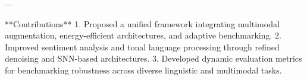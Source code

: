 ---

**Contributions**  
1. Proposed a unified framework integrating multimodal augmentation, energy-efficient architectures, and adaptive benchmarking.  
2. Improved sentiment analysis and tonal language processing through refined denoising and SNN-based architectures.  
3. Developed dynamic evaluation metrics for benchmarking robustness across diverse linguistic and multimodal tasks.  